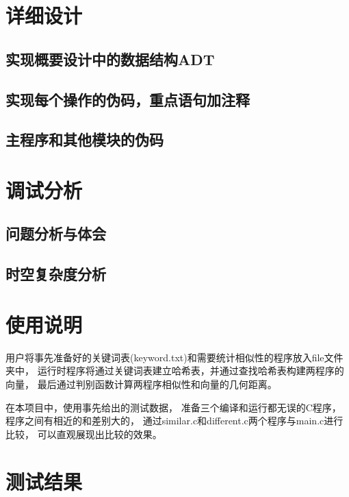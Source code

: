 \documentclass[a4paper]{article}
\begin{document}
    \section{详细设计}\label{sec:design2}

    \subsection{实现概要设计中的数据结构ADT}\label{subsec:adt2}

    \subsection{实现每个操作的伪码，重点语句加注释}\label{subsec:explain}

    \subsection{主程序和其他模块的伪码}\label{subsec:code2}


    \section{调试分析}\label{sec:debug}

    \subsection{问题分析与体会}\label{subsec:analysis}

    \subsection{时空复杂度分析}\label{subsec:analysis2}


    \section{使用说明}\label{sec:instrut}
    {{用户将事先准备好的关键词表(keyword.txt)和需要统计相似性的程序放入file文件夹中，
    运行时程序将通过关键词表建立哈希表，并通过查找哈希表构建两程序的向量，
    最后通过判别函数计算两程序相似性和向量的几何距离。}}

    {{在本项目中，使用事先给出的测试数据，
    准备三个编译和运行都无误的C程序，程序之间有相近的和差别大的，
    通过similar.c和different.c两个程序与main.c进行比较，
    可以直观展现出比较的效果。}}


    \section{测试结果}\label{sec:result}
\end{document}
